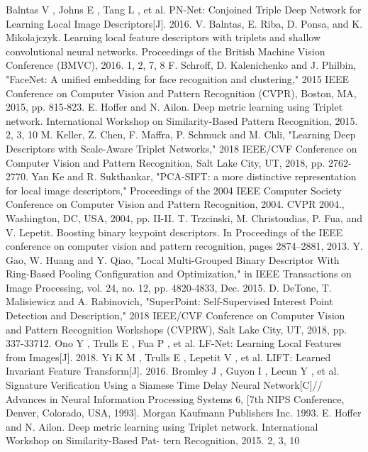 \documentclass[letterpaper, 10 pt, conference]{ieeeconf}  %
\begin{document}
\begin{thebibliography}{99}
 Balntas V , Johns E , Tang L , et al. PN-Net: Conjoined Triple Deep Network for Learning Local Image Descriptors[J]. 2016.
 V. Balntas, E. Riba, D. Ponsa, and K. Mikolajczyk. Learning local feature descriptors with triplets and shallow convolutional neural networks. Proceedings of the British Machine Vision Conference (BMVC), 2016. 1, 2, 7, 8
 F. Schroff, D. Kalenichenko and J. Philbin, "FaceNet: A unified embedding for face recognition and clustering," 2015 IEEE Conference on Computer Vision and Pattern Recognition (CVPR), Boston, MA, 2015, pp. 815-823.
 E. Hoffer and N. Ailon. Deep metric learning using Triplet network. International Workshop on Similarity-Based Pattern Recognition, 2015. 2, 3, 10
 M. Keller, Z. Chen, F. Maffra, P. Schmuck and M. Chli, "Learning Deep Descriptors with Scale-Aware Triplet Networks," 2018 IEEE/CVF Conference on Computer Vision and Pattern Recognition, Salt Lake City, UT, 2018, pp. 2762-2770.
 Yan Ke and R. Sukthankar, "PCA-SIFT: a more distinctive representation for local image descriptors," Proceedings of the 2004 IEEE Computer Society Conference on Computer Vision and Pattern Recognition, 2004. CVPR 2004., Washington, DC, USA, 2004, pp. II-II.
 T. Trzcinski, M. Christoudias, P. Fua, and V. Lepetit. Boosting binary keypoint descriptors. In Proceedings of the IEEE conference on computer vision and pattern recognition, pages 2874–2881, 2013.
 Y. Gao, W. Huang and Y. Qiao, "Local Multi-Grouped Binary Descriptor With Ring-Based Pooling Configuration and Optimization," in IEEE Transactions on Image Processing, vol. 24, no. 12, pp. 4820-4833, Dec. 2015.
 D. DeTone, T. Malisiewicz and A. Rabinovich, "SuperPoint: Self-Supervised Interest Point Detection and Description," 2018 IEEE/CVF Conference on Computer Vision and Pattern Recognition Workshops (CVPRW), Salt Lake City, UT, 2018, pp. 337-33712.
 Ono Y , Trulls E , Fua P , et al. LF-Net: Learning Local Features from Images[J]. 2018.
 Yi K M , Trulls E , Lepetit V , et al. LIFT: Learned Invariant Feature Transform[J]. 2016.
 Bromley J , Guyon I , Lecun Y , et al. Signature Verification Using a Siamese Time Delay Neural Network[C]// Advances in Neural Information Processing Systems 6, [7th NIPS Conference, Denver, Colorado, USA, 1993]. Morgan Kaufmann Publishers Inc. 1993.
 E. Hoffer and N. Ailon. Deep metric learning using Triplet network. International Workshop on Similarity-Based Pat- tern Recognition, 2015. 2, 3, 10

\end{thebibliography}
\end{document}
